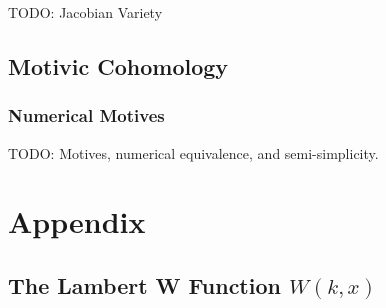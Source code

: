 \documentclass{amsart}
\begin{document}
TODO: Jacobian Variety {\cite[2.1.4p123]{MonsterMoonshine}}

\subsection{Motivic Cohomology}

\subsubsection{Numerical Motives}

TODO: {\cite{NumericalMotives92}} Motives, numerical equivalence, and
semi-simplicity.



\section{Appendix}

\subsection{The Lambert W Function $W (k, x)$}\label{lambertW}
\end{document}
